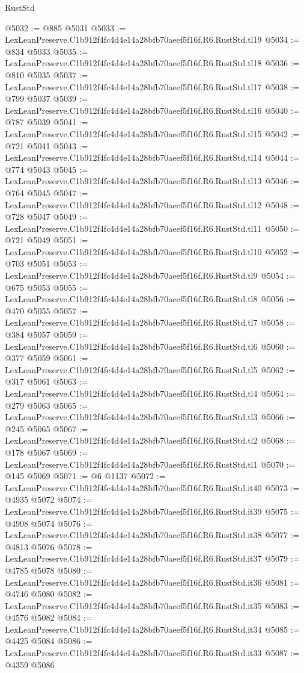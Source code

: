 \begin{lexlean}{RustStd}
\begin{coremodule}
@5032 := @885 @5031
@5033 := LexLeanPreserve.C1b912f4fc4d4e14a28bfb70aeef5f16f.R6.RustStd.tl19
@5034 := @834 @5033
@5035 := LexLeanPreserve.C1b912f4fc4d4e14a28bfb70aeef5f16f.R6.RustStd.tl18
@5036 := @810 @5035
@5037 := LexLeanPreserve.C1b912f4fc4d4e14a28bfb70aeef5f16f.R6.RustStd.tl17
@5038 := @799 @5037
@5039 := LexLeanPreserve.C1b912f4fc4d4e14a28bfb70aeef5f16f.R6.RustStd.tl16
@5040 := @787 @5039
@5041 := LexLeanPreserve.C1b912f4fc4d4e14a28bfb70aeef5f16f.R6.RustStd.tl15
@5042 := @721 @5041
@5043 := LexLeanPreserve.C1b912f4fc4d4e14a28bfb70aeef5f16f.R6.RustStd.tl14
@5044 := @774 @5043
@5045 := LexLeanPreserve.C1b912f4fc4d4e14a28bfb70aeef5f16f.R6.RustStd.tl13
@5046 := @764 @5045
@5047 := LexLeanPreserve.C1b912f4fc4d4e14a28bfb70aeef5f16f.R6.RustStd.tl12
@5048 := @728 @5047
@5049 := LexLeanPreserve.C1b912f4fc4d4e14a28bfb70aeef5f16f.R6.RustStd.tl11
@5050 := @721 @5049
@5051 := LexLeanPreserve.C1b912f4fc4d4e14a28bfb70aeef5f16f.R6.RustStd.tl10
@5052 := @703 @5051
@5053 := LexLeanPreserve.C1b912f4fc4d4e14a28bfb70aeef5f16f.R6.RustStd.tl9
@5054 := @675 @5053
@5055 := LexLeanPreserve.C1b912f4fc4d4e14a28bfb70aeef5f16f.R6.RustStd.tl8
@5056 := @470 @5055
@5057 := LexLeanPreserve.C1b912f4fc4d4e14a28bfb70aeef5f16f.R6.RustStd.tl7
@5058 := @384 @5057
@5059 := LexLeanPreserve.C1b912f4fc4d4e14a28bfb70aeef5f16f.R6.RustStd.tl6
@5060 := @377 @5059
@5061 := LexLeanPreserve.C1b912f4fc4d4e14a28bfb70aeef5f16f.R6.RustStd.tl5
@5062 := @317 @5061
@5063 := LexLeanPreserve.C1b912f4fc4d4e14a28bfb70aeef5f16f.R6.RustStd.tl4
@5064 := @279 @5063
@5065 := LexLeanPreserve.C1b912f4fc4d4e14a28bfb70aeef5f16f.R6.RustStd.tl3
@5066 := @245 @5065
@5067 := LexLeanPreserve.C1b912f4fc4d4e14a28bfb70aeef5f16f.R6.RustStd.tl2
@5068 := @178 @5067
@5069 := LexLeanPreserve.C1b912f4fc4d4e14a28bfb70aeef5f16f.R6.RustStd.tl1
@5070 := @145 @5069
@5071 := @6 @1137
@5072 := LexLeanPreserve.C1b912f4fc4d4e14a28bfb70aeef5f16f.R6.RustStd.it40
@5073 := @4935 @5072
@5074 := LexLeanPreserve.C1b912f4fc4d4e14a28bfb70aeef5f16f.R6.RustStd.it39
@5075 := @4908 @5074
@5076 := LexLeanPreserve.C1b912f4fc4d4e14a28bfb70aeef5f16f.R6.RustStd.it38
@5077 := @4813 @5076
@5078 := LexLeanPreserve.C1b912f4fc4d4e14a28bfb70aeef5f16f.R6.RustStd.it37
@5079 := @4785 @5078
@5080 := LexLeanPreserve.C1b912f4fc4d4e14a28bfb70aeef5f16f.R6.RustStd.it36
@5081 := @4746 @5080
@5082 := LexLeanPreserve.C1b912f4fc4d4e14a28bfb70aeef5f16f.R6.RustStd.it35
@5083 := @4576 @5082
@5084 := LexLeanPreserve.C1b912f4fc4d4e14a28bfb70aeef5f16f.R6.RustStd.it34
@5085 := @4425 @5084
@5086 := LexLeanPreserve.C1b912f4fc4d4e14a28bfb70aeef5f16f.R6.RustStd.it33
@5087 := @4359 @5086

\end{coremodule}
\end{lexlean}
